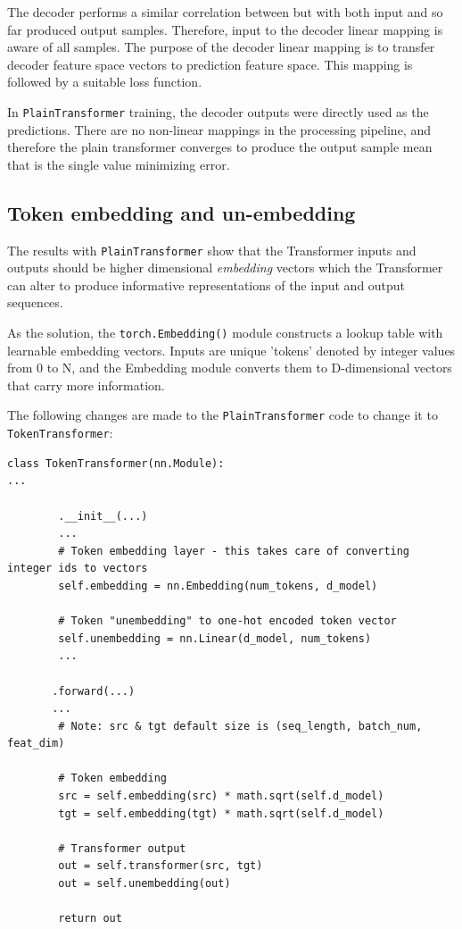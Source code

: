 \documentclass[final]{article}
\begin{document}
The decoder performs a similar correlation between but with both input and so far produced output samples. Therefore, input to the decoder linear mapping is aware of all samples.  The purpose of the decoder linear mapping is to transfer
decoder feature space vectors to prediction feature space. This mapping is followed by a suitable loss function.

In \texttt{PlainTransformer} training, the decoder outputs were
directly used as the predictions. There are no non-linear mappings
in the processing pipeline, and therefore the plain transformer converges to
produce the output sample mean that is the single value minimizing error.

\subsection{Token embedding and un-embedding}

The results with \texttt{PlainTransformer} show
that the Transformer inputs and outputs should be higher dimensional
\textit{embedding} vectors which the Transformer can alter to
produce informative representations of the input and
output sequences.

As the solution, the \texttt{torch.Embedding()} module constructs a
lookup table with learnable embedding vectors. Inputs are unique 'tokens' denoted by integer values from 0 to N, and the Embedding module converts them to D-dimensional vectors that carry more information.

The following changes are made to the \texttt{PlainTransformer} code
to change it to \texttt{TokenTransformer}:
\begin{lstlisting}
class TokenTransformer(nn.Module):
...

        .__init__(...)
        ...
        # Token embedding layer - this takes care of converting integer ids to vectors
        self.embedding = nn.Embedding(num_tokens, d_model)

        # Token "unembedding" to one-hot encoded token vector
        self.unembedding = nn.Linear(d_model, num_tokens)
        ...
        
       .forward(...)
       ...
        # Note: src & tgt default size is (seq_length, batch_num, feat_dim)

        # Token embedding
        src = self.embedding(src) * math.sqrt(self.d_model)
        tgt = self.embedding(tgt) * math.sqrt(self.d_model)        

        # Transformer output
        out = self.transformer(src, tgt)
        out = self.unembedding(out)
        
        return out
\end{lstlisting}
\end{document}
